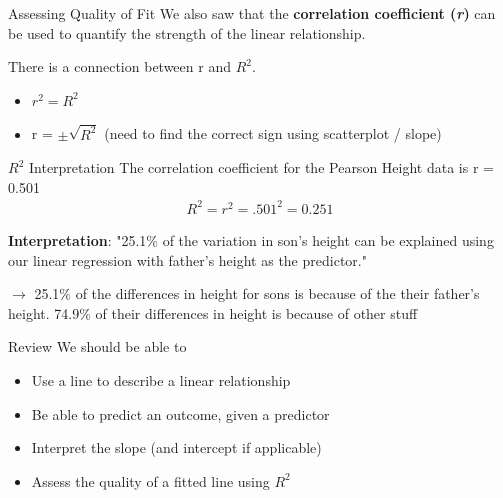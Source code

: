 \documentclass{beamer}
\begin{document}
\begin{frame}{Assessing Quality of Fit}
We also saw that the \textbf{correlation coefficient (\textit{r})} can be used to quantify the strength of the linear relationship. \vspace{3mm}

There is a connection between r and $R^2$.
\begin{itemize}
    \item $r^2 = R^2$
    \item r = $\pm \sqrt{R^2}$ \hspace{2mm} (need to find the correct sign using scatterplot / slope)
\end{itemize}
\end{frame}

\begin{frame}{$R^2$ Interpretation}
    The correlation coefficient for the Pearson Height data is r = 0.501
\begin{align*}
    R^2 = r^2 = .501^2 = 0.251
\end{align*} \vspace{3mm}

\textbf{Interpretation}:
"25.1$\%$ of the variation in son's height can be explained using our linear regression with father's height as the predictor." \vspace{3mm}

$\rightarrow$ 25.1$\%$ of the differences in height for sons is because of the their father's height. 74.9$\%$ of their differences in height is because of other stuff

\end{frame}






\begin{frame}{Review}
We should be able to 

\begin{itemize}
\item Use a line to describe a linear relationship
\item Be able to predict an outcome, given a predictor
\item Interpret the slope (and intercept if applicable)
\item Assess the quality of a fitted line using $R^2$
\end{itemize}
\end{frame}


%
%
%
%
%
%


%
%
\end{document}
